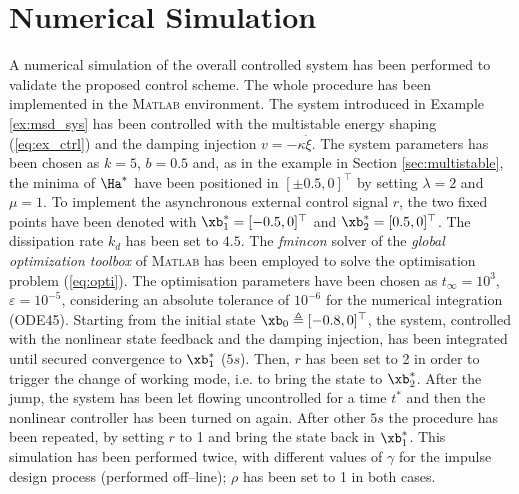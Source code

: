 \section{Numerical Simulation}
%
A numerical simulation of the overall controlled system has been performed to validate the proposed control scheme. The whole procedure has been implemented in the \textsc{Matlab}\textsuperscript{\textregistered}%
environment. The system introduced in Example \ref{ex:msd_sys} has been controlled with the multistable energy shaping (\ref{eq:ex_ctrl}) and the damping injection $v = -\kappa\dot{\xi}$. The system parameters has been chosen as $k = 5$, $b = 0.5$ and, as in the example in Section \ref{sec:multistable}, the minima of $\Ha^*$ have been positioned in $[\pm 0.5,0]^\top$ by setting $\lambda = 2$ and $\mu = 1$.
{%
To implement the asynchronous external control signal $r$, the two fixed points have been denoted with $\xb_1^* = [-0.5,0]^\top$ and $\xb_2^* = [0.5,0]^\top$.}
The dissipation rate $k_d$ has been set to $4.5$. 
The \textit{fmincon} solver of the \textit{global optimization toolbox} of \textsc{Matlab}\textsuperscript{\textregistered} has been employed to solve the optimisation problem (\ref{eq:opti}). The optimisation parameters have been chosen as $t_\infty=10^3$, $\varepsilon=10^{-5}$, considering an absolute tolerance of $10^{-6}$ for the numerical integration (ODE45).
Starting from the initial state $\xb_0 \triangleq [-0.8,0]^\top$, the system, controlled with the nonlinear state feedback and the damping injection, has been integrated until secured convergence to $\xb_1^*$ ($5s$). Then, $r$ has been set to 2 in order to trigger the change of working mode, i.e. to bring the state to $\xb_2^*$. After the jump, the system has been let flowing uncontrolled for a time $t^*$ and then the nonlinear controller has been turned on again. After other $5s$ the procedure has been repeated, by setting $r$ to 1 and bring the state back in $\xb_1^*$.
This simulation has been performed twice, with different values of $\gamma$ for the impulse design process (performed off--line); $\rho$ has been set to 1 in both cases. 

